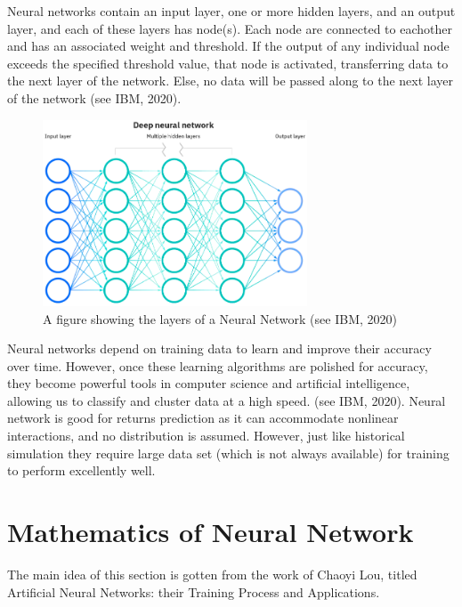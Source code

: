 \documentclass[a4paper,11pt,oneside]{book}
\begin{document}
Neural networks contain an input layer, one or more hidden layers, and an output layer, and each of these layers has node(s). Each node are connected to eachother and has an associated weight and threshold. If the output of any individual node exceeds the specified threshold value, that node is activated, transferring data to the next layer of the network. Else, no data will be passed along to the next layer of the network (see IBM, 2020).
\begin{figure}[!h]
	\centering
	\includegraphics[width=0.7\textwidth]{figures/NN}
	\caption{A figure showing the layers of a Neural Network (see IBM, 2020)}
	\label{firstfig}
\end{figure}\newline
Neural networks depend on training data to learn and improve their accuracy over time. However, once these learning algorithms are polished for accuracy, they become powerful tools in computer science and artificial intelligence, allowing us to classify and cluster data at a high speed. (see IBM, 2020).
\newline\newline
Neural network is good for returns prediction as it can accommodate nonlinear interactions, and no distribution is assumed. However, just like historical simulation they require large data set (which is not always available) for training to perform excellently well.





\section{Mathematics of Neural Network}
The main idea of this section is gotten from the work of Chaoyi Lou, titled Artificial Neural Networks:
their Training Process and Applications.
\end{document}
